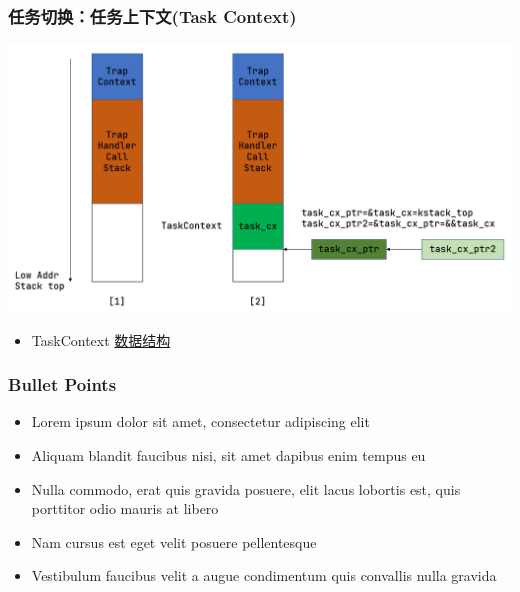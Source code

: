 % 
% 
% 
% 
\begin{frame}
	\frametitle{任务切换：任务上下文(Task Context)}
	\includegraphics[width=0.7\linewidth]{figs/task_context.png}
	\begin{itemize}
	\item TaskContext \href{https://github.com/rcore-os/rCore-Tutorial-v3/blob/ch3-coop/os/src/task/context.rs\#L2}{数据结构}
	\end{itemize}
\end{frame}
% 
% 
% 
\begin{frame}
	\frametitle{Bullet Points}
	\begin{itemize}
	\item Lorem ipsum dolor sit amet, consectetur adipiscing elit
	\item Aliquam blandit faucibus nisi, sit amet dapibus enim tempus eu
	\item Nulla commodo, erat quis gravida posuere, elit lacus lobortis est, quis porttitor odio mauris at libero
	\item Nam cursus est eget velit posuere pellentesque
	\item Vestibulum faucibus velit a augue condimentum quis convallis nulla gravida
	\end{itemize}
\end{frame}
